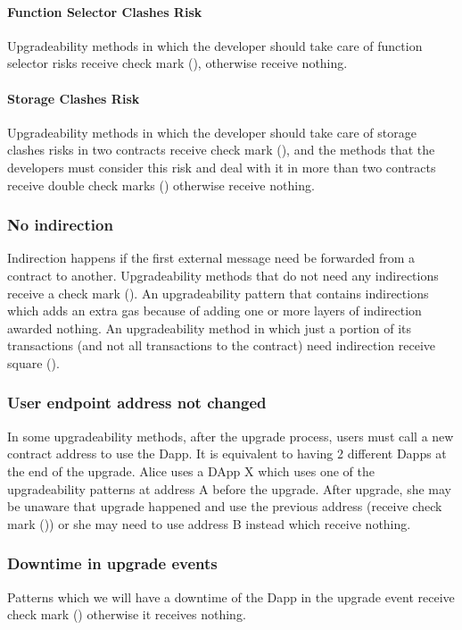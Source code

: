 \paragraph{Function Selector Clashes Risk}
Upgradeability methods in which the developer should take care of function selector risks receive check mark (\checkmark), otherwise receive nothing. 

\paragraph{Storage Clashes Risk}
Upgradeability methods in which the developer should take care of storage clashes risks in two contracts receive check mark (\checkmark), and the methods that the developers must consider this risk and deal with it in more than two contracts receive double check marks (\checkmark\checkmark) otherwise receive nothing. 

 \subsubsection{No indirection}  
 Indirection happens if the first external message need be forwarded from a contract to another. Upgradeability methods that do not need any indirections receive a check mark (\checkmark). An upgradeability pattern that contains indirections which adds an extra gas because of adding one or more layers of indirection awarded nothing. An upgradeability method in which just a portion of its transactions (and not all transactions to the contract) need indirection receive square (\XBox). 

\subsubsection{User endpoint address not changed}
In some upgradeability methods, after the upgrade process, users must call a new contract address to use the Dapp. It is equivalent to having 2 different Dapps at the  end of the upgrade. Alice uses a DApp X which uses one of the upgradeability patterns at address A before the upgrade. After upgrade, she may be unaware that upgrade happened and use the previous address (receive check mark (\checkmark)) or she may need to use address B instead which receive nothing.


\subsubsection{Downtime in upgrade events}
Patterns which we will have a downtime of the Dapp in the upgrade event receive check mark (\checkmark) otherwise it receives nothing. 


